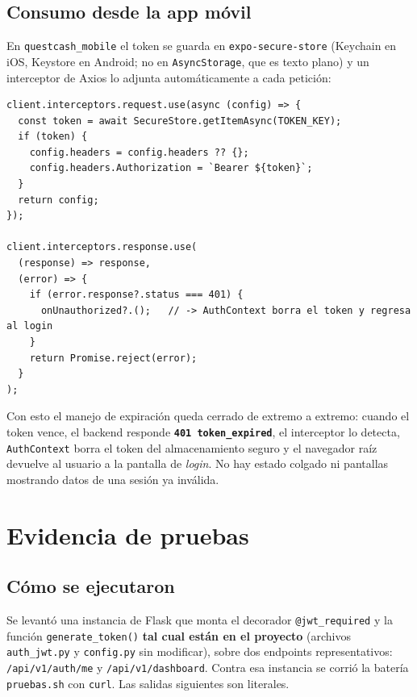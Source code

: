 \documentclass[11pt,letterpaper]{article}
\newcommand{\http}[2]{\textcolor{#1}{\texttt{\textbf{#2}}}}
\begin{document}
\subsection{Consumo desde la app móvil}

En \texttt{questcash\_mobile} el token se guarda en \texttt{expo-secure-store} (Keychain en
iOS, Keystore en Android; no en \texttt{AsyncStorage}, que es texto plano) y un interceptor
de Axios lo adjunta automáticamente a cada petición:

\begin{lstlisting}[style=python,caption={\texttt{src/services/api.ts} — inyección del token y reacción al 401.}]
client.interceptors.request.use(async (config) => {
  const token = await SecureStore.getItemAsync(TOKEN_KEY);
  if (token) {
    config.headers = config.headers ?? {};
    config.headers.Authorization = `Bearer ${token}`;
  }
  return config;
});

client.interceptors.response.use(
  (response) => response,
  (error) => {
    if (error.response?.status === 401) {
      onUnauthorized?.();   // -> AuthContext borra el token y regresa al login
    }
    return Promise.reject(error);
  }
);
\end{lstlisting}

Con esto el manejo de expiración queda cerrado de extremo a extremo: cuando el token vence,
el backend responde \http{qcRed}{401 token\_expired}, el interceptor lo detecta,
\texttt{AuthContext} borra el token del almacenamiento seguro y el navegador raíz devuelve
al usuario a la pantalla de \emph{login}. No hay estado colgado ni pantallas mostrando datos
de una sesión ya inválida.

\section{Evidencia de pruebas}
\label{sec:evidencia}

\subsection{Cómo se ejecutaron}

Se levantó una instancia de Flask que monta el decorador \texttt{@jwt\_required} y la función
\texttt{generate\_token()} \textbf{tal cual están en el proyecto} (archivos \texttt{auth\_jwt.py}
y \texttt{config.py} sin modificar), sobre dos endpoints representativos:
\texttt{/api/v1/auth/me} y \texttt{/api/v1/dashboard}. Contra esa instancia se corrió la
batería \texttt{pruebas.sh} con \texttt{curl}. Las salidas siguientes son literales.
\end{document}
